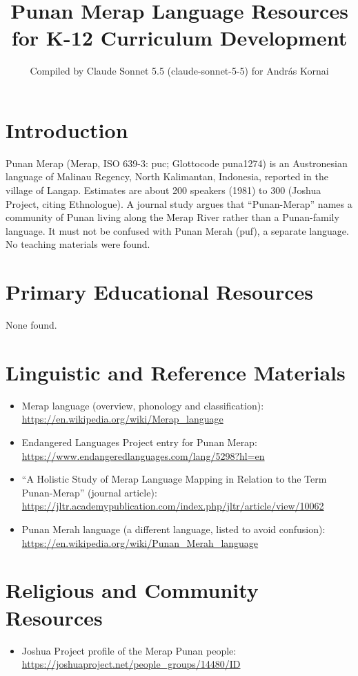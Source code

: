 \documentclass[12pt]{article}
\title{Punan Merap Language Resources for K-12 Curriculum Development}
\author{Compiled by Claude Sonnet 5.5 (claude-sonnet-5-5) for Andr\'as Kornai}
\date{}
\begin{document}
\maketitle

\section{Introduction}
Punan Merap (Merap, ISO 639-3: puc; Glottocode puna1274) is an Austronesian language of Malinau Regency, North Kalimantan, Indonesia, reported in the village of Langap. Estimates are about 200 speakers (1981) to 300 (Joshua Project, citing Ethnologue). A journal study argues that ``Punan-Merap'' names a community of Punan living along the Merap River rather than a Punan-family language. It must not be confused with Punan Merah (puf), a separate language. No teaching materials were found.

\section{Primary Educational Resources}
None found.

\section{Linguistic and Reference Materials}
\begin{itemize}
\item Merap language (overview, phonology and classification): \url{https://en.wikipedia.org/wiki/Merap_language}
\item Endangered Languages Project entry for Punan Merap: \url{https://www.endangeredlanguages.com/lang/5298?hl=en}
\item ``A Holistic Study of Merap Language Mapping in Relation to the Term Punan-Merap'' (journal article): \url{https://jltr.academypublication.com/index.php/jltr/article/view/10062}
\item Punan Merah language (a different language, listed to avoid confusion): \url{https://en.wikipedia.org/wiki/Punan_Merah_language}
\end{itemize}

\section{Religious and Community Resources}
\begin{itemize}
\item Joshua Project profile of the Merap Punan people: \url{https://joshuaproject.net/people_groups/14480/ID}
\end{itemize}
\end{document}

